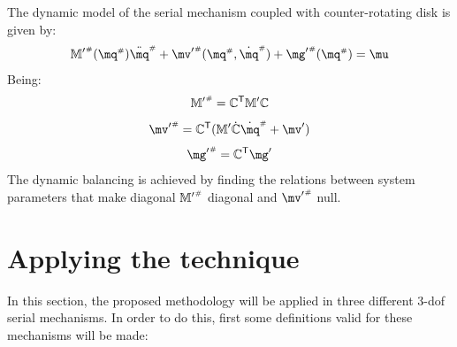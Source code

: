 \documentclass[a4paper,11pt,brazil,fleqn]{article}
\begin{document}
The dynamic model of the serial mechanism coupled with counter-rotating disk is given by:
\begin{equation}\label{eq:CoupledDynamics}
{\mM'}\ssh (\mq\ssh) \ddot{\mq}\ssh + {\mv'}\ssh(\mq\ssh,\dot{\mq}\ssh) + {\mg'}\ssh (\mq\ssh) = \mu
\end{equation}
Being:
\begin{equation}\label{eq:Mh'}
{\mathbb{M}'}^{\scriptscriptstyle \#} = \mathbb{C}^{\mathsf{T}} \mathbb{M}' \mathbb{C}
\end{equation}
\begin{equation}\label{eq:vh'}
{\mv'}\ssh = \mC^\msT ( \mM' \dot{\mC} \dot{\mq}\ssh + \mv')
\end{equation}
\begin{equation}\label{eq:gh'}
{\mg'}\ssh = \mC^\msT \mg'
\end{equation}
The dynamic balancing is achieved by finding the relations between system parameters that make diagonal ${\mathbb{M}'}^{\scriptscriptstyle \#}$ diagonal and ${\mv'}\ssh$ null.


 

\section{Applying the technique}\label{S03}

In this section, the proposed methodology will be applied in three different 3-dof serial mechanisms. In order to do this, first some definitions valid for these mechanisms will be made:
\end{document}

